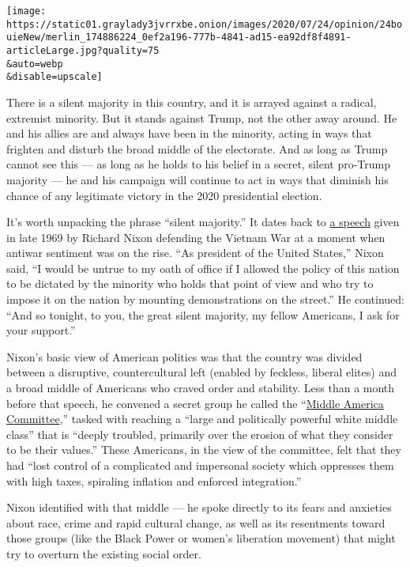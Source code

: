 \texttt{[image: https://static01.graylady3jvrrxbe.onion/images/2020/07/24/opinion/24bouieNew/merlin\_174886224\_0ef2a196-777b-4841-ad15-ea92df8f4891-articleLarge.jpg?quality=75\\\&auto=webp\\\&disable=upscale]}

There is a silent majority in this country, and it is arrayed against a
radical, extremist minority. But it stands against Trump, not the other
away around. He and his allies are and always have been in the minority,
acting in ways that frighten and disturb the broad middle of the
electorate. And as long as Trump cannot see this --- as long as he holds
to his belief in a secret, silent pro-Trump majority --- he and his
campaign will continue to act in ways that diminish his chance of any
legitimate victory in the 2020 presidential election.

It's worth unpacking the phrase ``silent majority.'' It dates back to
\href{http://chnm.gmu.edu/hardhats/silent.html}{a speech} given in late
1969 by Richard Nixon defending the Vietnam War at a moment when antiwar
sentiment was on the rise. ``As president of the United States,'' Nixon
said, ``I would be untrue to my oath of office if I allowed the policy
of this nation to be dictated by the minority who holds that point of
view and who try to impose it on the nation by mounting demonstrations
on the street.'' He continued: ``And so tonight, to you, the great
silent majority, my fellow Americans, I ask for your support.''

Nixon's basic view of American politics was that the country was divided
between a disruptive, countercultural left (enabled by feckless, liberal
elites) and a broad middle of Americans who craved order and stability.
Less than a month before that speech, he convened a secret group he
called the
``\href{https://www.google.com/books/edition/President_Nixon/ajLBlZwwB0IC?hl=en\&gbpv=1\&bsq=\%E2\%80\%9Cmiddle\%20america\%20committee\%E2\%80\%9D}{Middle
America Committee},'' tasked with reaching a ``large and politically
powerful white middle class'' that is ``deeply troubled, primarily over
the erosion of what they consider to be their values.'' These Americans,
in the view of the committee, felt that they had ``lost control of a
complicated and impersonal society which oppresses them with high taxes,
spiraling inflation and enforced integration.''

Nixon identified with that middle --- he spoke directly to its fears and
anxieties about race, crime and rapid cultural change, as well as its
resentments toward those groups (like the Black Power or women's
liberation movement) that might try to overturn the existing social
order.

